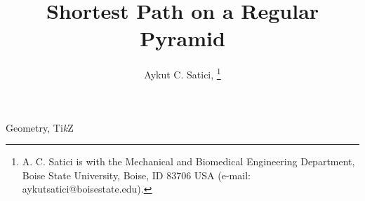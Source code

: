 \documentclass[journal,twoside,web]{ieeecolor}
\begin{document}
\title{Shortest Path on a Regular Pyramid} 
\author{
    Aykut C. Satici, 
    \thanks{A. C. Satici is with the Mechanical and Biomedical Engineering Department, Boise State University, Boise, ID 83706 USA
    (e-mail: aykutsatici@boisestate.edu).}
}
\maketitle

  

\begin{IEEEkeywords}
  Geometry, Ti\textit{k}Z
\end{IEEEkeywords}






        
  

% 
\end{document}
